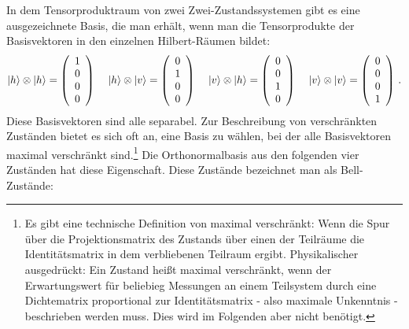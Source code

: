 In dem Tensorproduktraum von zwei Zwei-Zustandssystemen gibt es eine ausgezeichnete Basis, die man erh\"alt,
wenn man die Tensorprodukte der Basisvektoren in den einzelnen Hilbert-R\"aumen bildet:
\begin{equation}
           |h\rangle \otimes |h\rangle = \left( \begin{array}{c}  1 \\ 0 \\ 0 \\ 0 \end{array} \right) \hspace{0.4cm}
           |h\rangle \otimes |v\rangle = \left( \begin{array}{c}  0 \\ 1 \\ 0 \\ 0 \end{array} \right) \hspace{0.4cm}
           |v\rangle \otimes |h\rangle = \left( \begin{array}{c}  0 \\ 0 \\ 1 \\ 0 \end{array} \right) \hspace{0.4cm}
           |v\rangle \otimes |v\rangle = \left( \begin{array}{c}  0 \\ 0 \\ 0 \\ 1 \end{array} \right) \, .
\end{equation}
Diese Basisvektoren sind alle separabel. Zur Beschreibung von verschr\"ankten Zust\"anden bietet es sich
oft an, eine Basis zu w\"ahlen, bei der alle Basisvektoren maximal verschr\"ankt sind.\footnote{Es gibt eine
technische Definition von maximal verschr\"ankt: Wenn die Spur \"uber die Projektionsmatrix des Zustands 
\"uber einen der Teilr\"aume die Identit\"atsmatrix in dem verbliebenen Teilraum ergibt. Physikalischer
ausgedr\"uckt: Ein Zustand hei\ss t maximal verschr\"ankt, wenn der Erwartungswert f\"ur beliebieg 
Messungen an einem Teilsystem durch eine Dichtematrix proportional zur Identit\"atsmatrix - also maximale
Unkenntnis - beschrieben werden muss. Dies wird im Folgenden
aber nicht ben\"otigt.} Die Orthonormalbasis aus den folgenden vier Zust\"anden hat diese Eigenschaft.
Diese Zust\"ande bezeichnet man als Bell-Zust\"ande:
